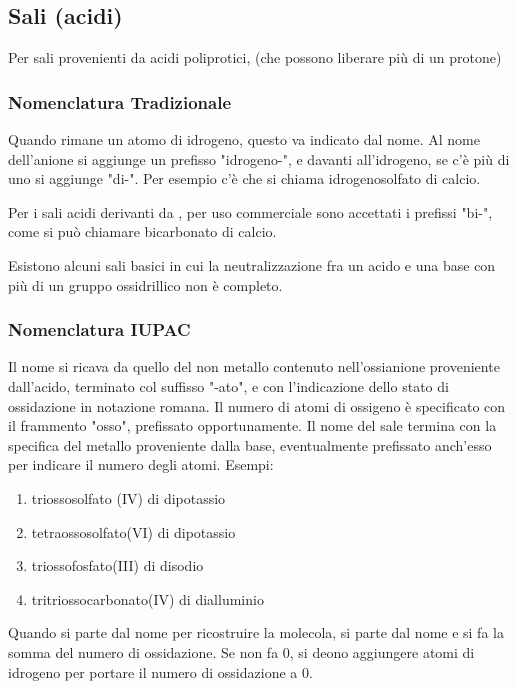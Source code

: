 \documentclass[a4paper]{article}
\begin{document}
\subsection{Sali (acidi)}
Per sali provenienti da acidi poliprotici, (che possono liberare più di un protone)

\subsubsection{Nomenclatura Tradizionale}
Quando rimane un atomo di idrogeno, questo va indicato dal nome. Al nome dell'anione si aggiunge un prefisso "idrogeno-", e davanti all'idrogeno, se c'è più di uno si aggiunge "di-". Per esempio c'è  che si chiama idrogenosolfato di calcio. 

Per i sali acidi derivanti da , per uso commerciale sono accettati i prefissi "bi-", come  si può chiamare bicarbonato di calcio. 

Esistono alcuni sali basici in cui la neutralizzazione fra un acido e una base con più di un gruppo ossidrillico non è completo. 

\subsubsection{Nomenclatura IUPAC}
Il nome si ricava da quello del non metallo contenuto nell'ossianione proveniente dall'acido, terminato col suffisso "-ato", e con l'indicazione dello stato di ossidazione in notazione romana. Il numero di atomi di ossigeno è specificato con il frammento "osso", prefissato opportunamente. Il nome del sale termina con la specifica del metallo proveniente dalla base, eventualmente prefissato anch'esso per indicare il numero degli atomi. Esempi:
\begin{enumerate}
    \item {} triossosolfato (IV) di dipotassio
    \item {} tetraossosolfato(VI) di dipotassio
    \item {} triossofosfato(III) di disodio
    \item {} tritriossocarbonato(IV) di dialluminio
\end{enumerate}

Quando si parte dal nome per ricostruire la molecola, si parte dal nome e si fa la somma del numero di ossidazione. Se non fa 0, si deono aggiungere atomi di idrogeno per portare il numero di ossidazione a 0. 
\end{document}
